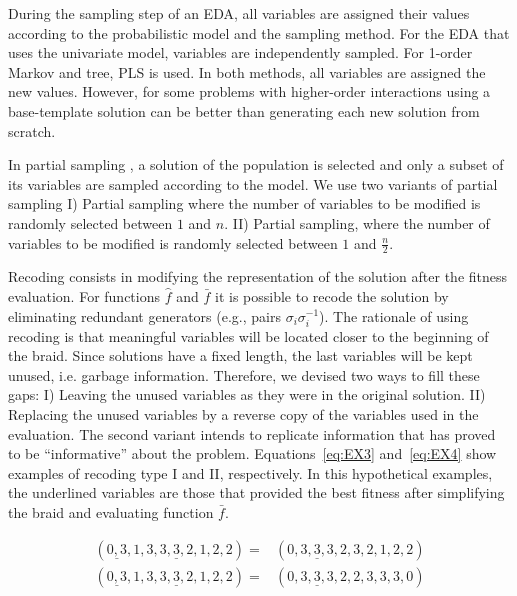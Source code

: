   During the sampling step of an EDA, all variables are assigned their values according to the probabilistic model and the sampling method. For the EDA that uses the univariate model, variables are independently sampled. For 1-order Markov and tree, PLS \cite{Henrion:1988} is used. In both methods, all variables are assigned the new values. However, for some problems with higher-order interactions using a base-template solution can be better than generating each new solution from scratch. 

 In partial sampling \cite{Pereira_et_al:2000,Tsutsui_et_al:2003}, a solution of the population is selected and only a subset of its variables are sampled according to the model. We use two variants of partial sampling I) Partial sampling where the number of variables to be modified is randomly selected between $1$ and $n$. II)  Partial sampling, where  the number of variables to be modified is randomly selected between $1$ and $\frac{n}{2}$.

  Recoding consists in modifying the representation of the solution after  the fitness evaluation. For functions $\hat{f}$ and $\bar{f}$ it is possible to recode the solution by eliminating redundant generators (e.g.,  pairs $\sigma_i \sigma_i^{-1}$). The rationale of using recoding is that meaningful variables will be located closer to the beginning of the braid. Since solutions have a fixed length, the last variables will be kept unused, i.e. garbage information. Therefore, we devised two ways to fill these gaps: I) Leaving the unused variables as they were in the original solution. II) Replacing the unused variables by a reverse copy of the variables used in the evaluation. The second variant intends to replicate information that has proved to be ``informative'' about the problem. Equations~\eqref{eq:EX3} and~\eqref{eq:EX4} show examples of recoding type I and II, respectively. In this hypothetical examples, the underlined variables are those that provided the best fitness after simplifying the braid and evaluating function $\bar{f}$.  

\begin{align}
   (\underline{0,3},1,3,\underline{3,3,2},1,2,2) =&  (\underline{0,3,3,3,2},3,2,1,2,2) \label{eq:EX3} \\
(\underline{0,3},1,3,\underline{3,3,2},1,2,2) =&  (\underline{0,3,3,3,2},2,3,3,3,0) \label{eq:EX4} 
\end{align}
 
